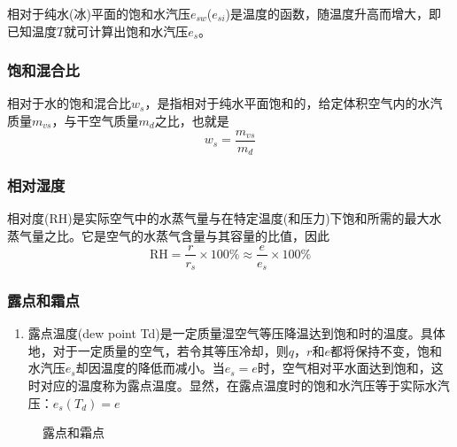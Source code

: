 \documentclass[UTF8,a4paper,11pt,oneside]{ctexbook}
\begin{document}
相对于纯水(冰)平面的饱和水汽压\(e_{sw}\)(\(e_{si}\))是温度的函数，随温度升高而增大，即已知温度\(T\)就可计算出饱和水汽压\(e_s\)。

\subsubsection{饱和混合比}

相对于水的饱和混合比\(w_s\)，是指相对于纯水平面饱和的，给定体积空气内的水汽质量\(m_{vs}\)，与干空气质量\(m_d\)之比，也就是
\begin{equation}
w_s=\dfrac{m_{vs}}{m_d}
\end{equation}

\subsubsection{相对湿度}

相对度(RH)是实际空气中的水蒸气量与在特定温度(和压力)下饱和所需的最大水蒸气量之比。它是空气的水蒸气含量与其容量的比值，因此
\begin{equation}
\mathrm{RH}=\dfrac{r}{r_s}\times100\%\approx\dfrac{e}{e_s}\times100\%
\end{equation}

\subsubsection{露点和霜点}
\begin{enumerate}
    \item 露点温度(dew point Td)是一定质量湿空气等压降温达到饱和时的温度。具体地，对于一定质量的空气，若令其等压冷却，则\(q\)，\(r\)和\(e\)都将保持不变，饱和水汽压\(e_s\)却因温度的降低而减小。当\(e_s=e\)时，空气相对平水面达到饱和，这时对应的温度称为露点温度。显然，在露点温度时的饱和水汽压等于实际水汽压：\(e_s(T_d)=e\)
\end{enumerate}
\begin{figure}[htbp]
    \centering
{}
    \caption{露点和霜点}
\end{figure}
\end{document}
